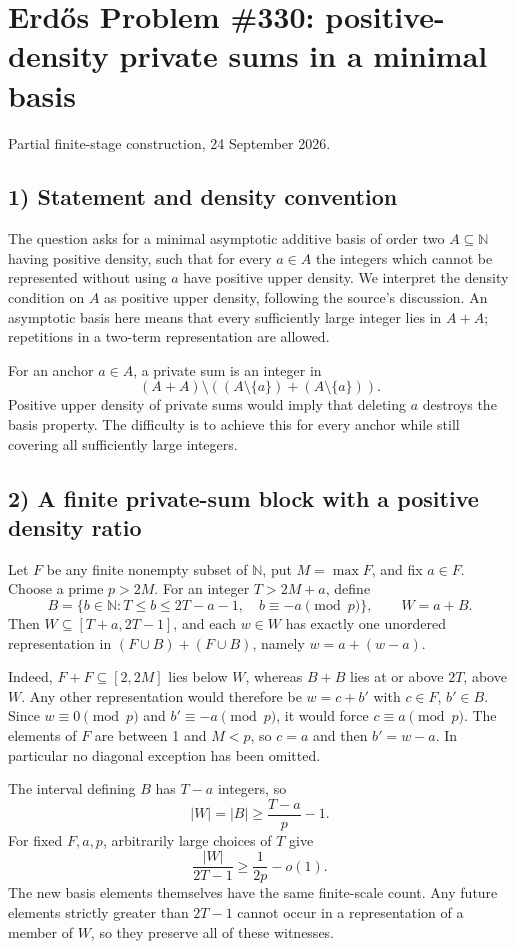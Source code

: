 \section{Erd\H{o}s Problem \#330: positive-density private sums in a minimal basis}
\noindent Partial finite-stage construction, 24 September 2026.

\subsection*{1) Statement and density convention}
The question asks for a minimal asymptotic additive basis of order two $A\subseteq\mathbb N$ having positive density, such that for every $a\in A$ the integers which cannot be represented without using $a$ have positive upper density. We interpret the density condition on $A$ as positive upper density, following the source's discussion. An asymptotic basis here means that every sufficiently large integer lies in $A+A$; repetitions in a two-term representation are allowed.

For an anchor $a\in A$, a private sum is an integer in
\[(A+A)\setminus((A\setminus\{a\})+(A\setminus\{a\})).
\]
Positive upper density of private sums would imply that deleting $a$ destroys the basis property. The difficulty is to achieve this for every anchor while still covering all sufficiently large integers.

\subsection*{2) A finite private-sum block with a positive density ratio}
Let $F$ be any finite nonempty subset of $\mathbb N$, put $M=\max F$, and fix $a\in F$. Choose a prime $p>2M$. For an integer $T>2M+a$, define
\[B=\{b\in\mathbb N:T\le b\le2T-a-1,\quad b\equiv-a\pmod p\},\qquad W=a+B.
\]
Then $W\subseteq[T+a,2T-1]$, and each $w\in W$ has exactly one unordered representation in $(F\cup B)+(F\cup B)$, namely $w=a+(w-a)$.

Indeed, $F+F\subseteq[2,2M]$ lies below $W$, whereas $B+B$ lies at or above $2T$, above $W$. Any other representation would therefore be $w=c+b'$ with $c\in F$, $b'\in B$. Since $w\equiv0\pmod p$ and $b'\equiv-a\pmod p$, it would force $c\equiv a\pmod p$. The elements of $F$ are between 1 and $M<p$, so $c=a$ and then $b'=w-a$. In particular no diagonal exception has been omitted.

The interval defining $B$ has $T-a$ integers, so
\[|W|=|B|\ge\frac{T-a}{p}-1.
\]
For fixed $F,a,p$, arbitrarily large choices of $T$ give
\[\frac{|W|}{2T-1}\ge\frac1{2p}-o(1).
\]
The new basis elements themselves have the same finite-scale count. Any future elements strictly greater than $2T-1$ cannot occur in a representation of a member of $W$, so they preserve all of these witnesses.

